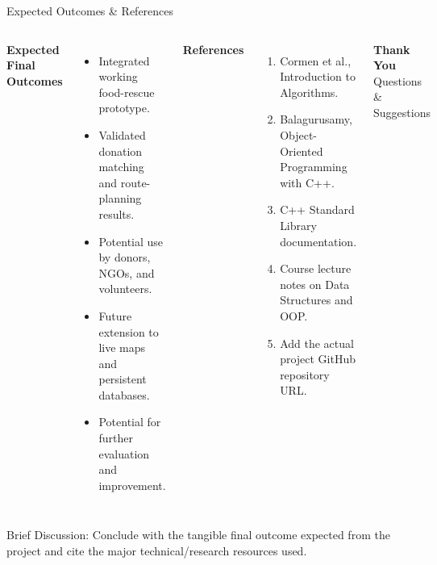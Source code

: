 \documentclass[aspectratio=169,11pt]{beamer}
\newcommand{\smallnote}[1]{%
\vspace{0.08cm}
{\scriptsize\color{GEUGrey}#1}
}
\begin{document}
\begin{frame}{Expected Outcomes \& References}

\begin{columns}[T,totalwidth=\textwidth]


\textbf{\color{GEUBlue}Expected Final Outcomes}

\begin{itemize}\itemsep3pt
\item Integrated working food-rescue prototype.
\item Validated donation matching and route-planning results.
\item Potential use by donors, NGOs, and volunteers.
\item Future extension to live maps and persistent databases.
\item Potential for further evaluation and improvement.
\end{itemize}


\textbf{\color{GEUBlue}References}

\begin{enumerate}\itemsep3pt
\item Cormen et al., Introduction to Algorithms.
\item Balagurusamy, Object-Oriented Programming with C++.
\item C++ Standard Library documentation.
\item Course lecture notes on Data Structures and OOP.
\item Add the actual project GitHub repository URL.
\end{enumerate}

\vfill

\begin{center}

\colorbox{GEUBlue}{
\parbox{.78\textwidth}{
\centering
\color{white}
\textbf{Thank You}\\
Questions \& Suggestions
}}

\end{center}

\end{columns}

\vfill

\smallnote{
Brief Discussion: Conclude with the tangible final outcome expected
from the project and cite the major technical/research resources used.
}

\end{frame}
\end{document}
